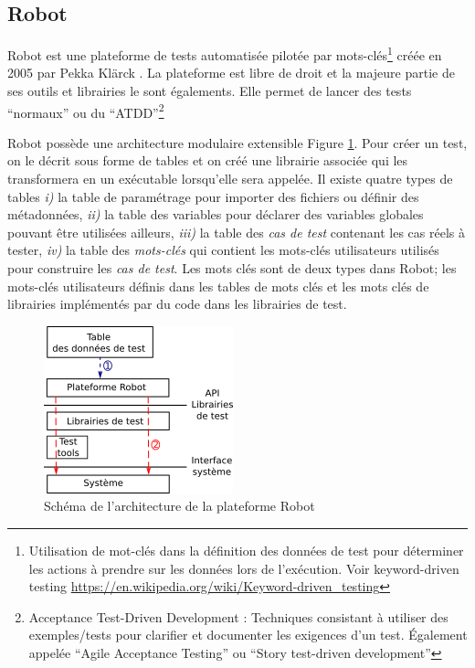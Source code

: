 \subsection{Robot}
\label{subsection:Robot}

Robot \citep{ROBOT_web} est une plateforme de tests automatisée pilotée par mots-clés\footnote{Utilisation de mot-clés dans la définition des données de test pour déterminer les actions à prendre sur les données lors de l'exécution. Voir keyword-driven testing  \url{https://en.wikipedia.org/wiki/Keyword-driven\_testing}} créée en 2005 par Pekka Klärck \citep{ROBOTlaukkanen2006data}. La plateforme est libre de droit et la majeure partie de ses outils et librairies le sont égalements. Elle permet de lancer des tests ``normaux'' ou du ``ATDD''\footnote{Acceptance Test-Driven Development \citep{ROBOTlarman2010practices}: Techniques consistant à utiliser des exemples/tests pour clarifier et documenter les exigences d'un test. Également appelée ``Agile Acceptance Testing'' ou ``Story test-driven development''}

Robot possède une architecture modulaire extensible
Figure \ref{Robot_arch}.  Pour créer un test, on le décrit sous forme de
tables et on créé une librairie associée qui les transformera en un
exécutable lorsqu'elle sera appelée. Il existe quatre types de tables
\textit{i)} la table de paramétrage pour importer des fichiers ou
définir des métadonnées, \textit{ii)} la table des variables pour
déclarer des variables globales pouvant être utilisées ailleurs,
\textit{iii)} la table des \textit{cas de test} contenant les cas
réels à tester, \textit{iv)} la table des \textit{mots-clés} qui
contient les mots-clés utilisateurs utilisés pour construire les
\textit{cas de test}.  Les mots clés sont de deux types dans Robot;
les mots-clés utilisateurs définis dans les tables de mots clés et les
mots clés de librairies implémentés par du code dans les librairies de
test.

\begin{figure}
  \centering
  \includegraphics{Pictures/png/Robot_architecture}
  \caption{Schéma de l'architecture de la plateforme Robot}
  \label{Robot_arch}
\end{figure}


